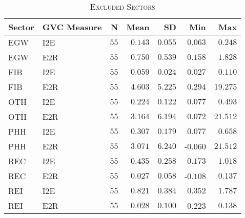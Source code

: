 \documentclass[a4paper]{article}
\begin{document}
\begin{table}[h!] \centering 
  \caption{\label{tab:EXCL_SEC}\textsc{Excluded Sectors}}
  \vspace{2mm}
\begin{tabular}{ llrrrrr} \toprule
Sector & GVC Measure  & N & Mean & SD & Min & Max \\ 
\midrule
EGW & I2E & $55$ & $0.143$ & $0.055$ & $0.063$ & $0.248$ \\ 
EGW & E2R & $55$ & $0.750$ & $0.539$ & $0.158$ & $1.828$ \\ 
FIB & I2E & $55$ & $0.059$ & $0.024$ & $0.027$ & $0.110$ \\ 
FIB & E2R & $55$ & $4.603$ & $5.225$ & $0.294$ & $19.275$ \\ 
OTH & I2E & $55$ & $0.224$ & $0.122$ & $0.077$ & $0.493$ \\ 
OTH & E2R & $55$ & $3.164$ & $6.194$ & $0.072$ & $21.512$ \\ 
PHH & I2E & $55$ & $0.307$ & $0.179$ & $0.077$ & $0.658$ \\ 
PHH & E2R & $55$ & $3.071$ & $6.240$ & -$0.060$ & $21.512$ \\ 
REC & I2E & $55$ & $0.435$ & $0.258$ & $0.173$ & $1.018$ \\ 
REC & E2R & $55$ & $0.027$ & $0.058$ & -$0.108$ & $0.137$ \\ 
REI & I2E & $55$ & $0.821$ & $0.384$ & $0.352$ & $1.787$ \\ 
REI & E2R & $55$ & $0.028$ & $0.100$ & -$0.223$ & $0.138$ \\ \bottomrule
\end{tabular} 
\end{table} 
\FloatBarrier
\end{document}
